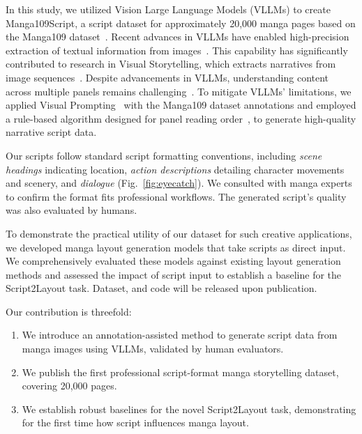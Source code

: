 In this study, we utilized Vision Large Language Models (VLLMs) to create Manga109Script, a script dataset for approximately 20,000 manga pages based on the Manga109 dataset~\cite{matsui2017sketch,aizawa_building_2020}.
Recent advances in VLLMs have enabled high-precision extraction of textual information from images~\cite{zhang_vision-language_2024}. This capability has significantly contributed to research in Visual Storytelling, which extracts narratives from image sequences~\cite{oliveira_story_2024, li_benchmark_2025}.
Despite advancements in VLLMs, understanding content across multiple panels remains challenging~\cite{ikuta_mangaub_2024,vivoli_comicap_2024}.
To mitigate VLLMs' limitations, we applied Visual Prompting~\cite{shtedritski_what_2023} with the Manga109 dataset annotations and employed a rule-based algorithm designed for panel reading order~\cite{sachdeva_manga_2024}, to generate high-quality narrative script data.

Our scripts follow standard script formatting conventions, including {\it scene headings} indicating location, {\it action descriptions} detailing character movements and scenery, and {\it dialogue} (Fig.~\ref{fig:eyecatch}).
We consulted with manga experts to confirm the format fits professional workflows.
The generated script's quality was also evaluated by humans.

To demonstrate the practical utility of our dataset for such creative applications, we developed manga layout generation models that take scripts as direct input.
We comprehensively evaluated these models against existing layout generation methods and assessed the impact of script input to establish a baseline for the Script2Layout task. Dataset, and code will be released upon publication.

Our contribution is threefold:
\begin{enumerate}
  \item We introduce an annotation-assisted method to generate script data from manga images using VLLMs, validated by human evaluators.
  \item We publish the first professional script-format manga storytelling dataset, covering 20,000 pages.
  \item We establish robust baselines for the novel Script2Layout task, demonstrating for the first time how script influences manga layout.
\end{enumerate}

